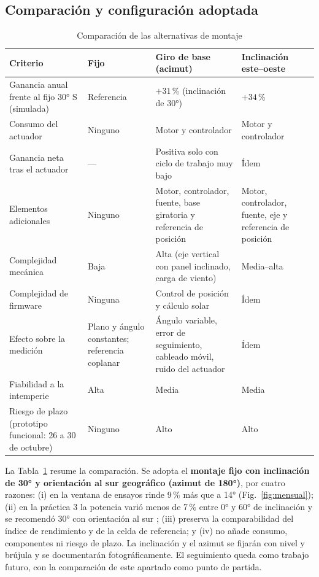 \documentclass[10pt,letterpaper,twocolumn]{article}
\begin{document}
\subsection{Comparación y configuración adoptada}
\begin{table}[t]
\centering
\caption{Comparación de las alternativas de montaje}
\label{tab:comp}
\footnotesize
\begin{tabularx}{\textwidth}{@{}>{\raggedright\arraybackslash}p{3.0cm}XXX@{}}
\toprule
Criterio & Fijo & Giro de base (acimut) & Inclinación este--oeste\\
\midrule
Ganancia anual frente al fijo 30° S (simulada) & Referencia & $+31$\,\% (inclinación de 30°) & $+34$\,\%\\
Consumo del actuador & Ninguno & Motor y controlador & Motor y controlador\\
Ganancia neta tras el actuador & --- & Positiva solo con ciclo de trabajo muy bajo \cite{switchdoc} & Ídem\\
Elementos adicionales & Ninguno & Motor, controlador, fuente, base giratoria y referencia de posición & Motor, controlador, fuente, eje y referencia de posición\\
Complejidad mecánica & Baja & Alta (eje vertical con panel inclinado, carga de viento) & Media--alta\\
Complejidad de firmware & Ninguna & Control de posición y cálculo solar & Ídem\\
Efecto sobre la medición & Plano y ángulo constantes; referencia coplanar & Ángulo variable, error de seguimiento, cableado móvil, ruido del actuador & Ídem\\
Fiabilidad a la intemperie & Alta & Media & Media\\
Riesgo de plazo (prototipo funcional: 26 a 30 de octubre) & Ninguno & Alto & Alto\\
\bottomrule
\end{tabularx}
\end{table}

La Tabla~\ref{tab:comp} resume la comparación. Se adopta el \textbf{montaje fijo con inclinación de 30° y orientación al sur geográfico (azimut de 180°)}, por cuatro razones: (i) en la ventana de ensayos rinde 9\,\% más que a 14° (Fig.~\ref{fig:mensual}); (ii) en la práctica 3 la potencia varió menos de 7\,\% entre 0° y 60° de inclinación y se recomendó 30° con orientación al sur \cite{lab3}; (iii) preserva la comparabilidad del índice de rendimiento y de la celda de referencia; y (iv) no añade consumo, componentes ni riesgo de plazo. La inclinación y el azimut se fijarán con nivel y brújula y se documentarán fotográficamente. El seguimiento queda como trabajo futuro, con la comparación de este apartado como punto de partida.
\end{document}
